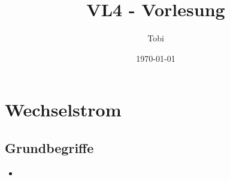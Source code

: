 \documentclass[a4paper,12pt]{article}
\title{VL4 - Vorlesung}
\author{Tobi}
\date{\today}
\begin{document}
\maketitle
\section{Wechselstrom}
\subsection*{Grundbegriffe}
\begin{itemize}
    \item 
\end{itemize}
\end{document}
